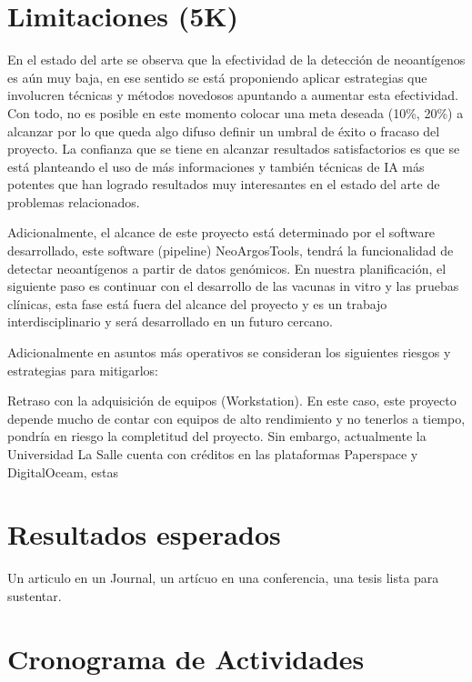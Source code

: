 \documentclass[a4paper,11pt]{article}
\begin{document}
\section{Limitaciones (5K)}

En el estado del arte se observa que la efectividad de la detección de neoantígenos es aún muy baja, en ese sentido se está proponiendo aplicar estrategias que involucren técnicas y métodos novedosos apuntando a aumentar esta efectividad. Con todo, no es posible en este momento colocar una meta deseada (10\%, 20\%) a alcanzar por lo que queda algo difuso definir un umbral de éxito o fracaso del proyecto. La confianza que se tiene en alcanzar resultados satisfactorios es que se está planteando el uso de más informaciones y también técnicas de IA más potentes que han logrado resultados muy interesantes en el estado del arte de problemas relacionados. 

Adicionalmente, el alcance de este proyecto está determinado por el software desarrollado, este software (pipeline) NeoArgosTools, tendrá la funcionalidad de detectar neoantígenos a partir de datos genómicos. En nuestra planificación, el siguiente paso es continuar con el desarrollo de las vacunas in vitro y las pruebas clínicas, esta fase está fuera del alcance del proyecto y es un trabajo interdisciplinario y será desarrollado en un futuro cercano.

Adicionalmente en asuntos más operativos se consideran los siguientes riesgos y estrategias para mitigarlos:

Retraso con la adquisición de equipos (Workstation). En este caso, este proyecto depende mucho de contar con equipos de alto rendimiento y no tenerlos a tiempo, pondría en riesgo la completitud del proyecto. Sin embargo, actualmente la Universidad La Salle cuenta con créditos en las plataformas Paperspace y DigitalOceam, estas 




\section{Resultados esperados}

Un articulo en un Journal, un artícuo en una conferencia, una tesis lista para sustentar.



\section{Cronograma de Actividades}
\end{document}
